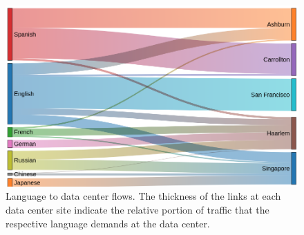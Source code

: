 \begin{figure}[h!]\centering
    \includegraphics[scale=0.4]{embodied_cost_model/images/sankey_dc_03.png}
    \caption[Language to Data Center Site Sankey Diagram]{Language to data center flows. The thickness of the links at each data center site indicate the relative portion of traffic that the respective language demands at the data center.}
    \label{land_dc_sankey_wan}
    \end{figure}